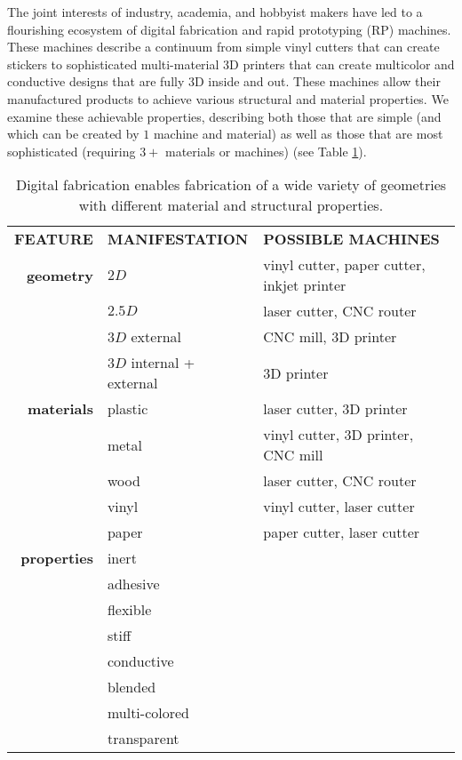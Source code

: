 The joint interests of industry, academia, and hobbyist makers have led to a flourishing ecosystem of digital fabrication and rapid prototyping (RP) machines. These machines describe a continuum from simple vinyl cutters that can create stickers to sophisticated multi-material 3D printers that can create multicolor and conductive designs that are fully 3D inside and out. These machines allow their manufactured products to achieve various structural and material properties. We examine these achievable properties, describing both those that are simple (and which can be created by $1$ machine and material) as well as those that are most sophisticated (requiring $3+$ materials or machines) (see Table \ref{table:properties}).


\begin{table}
\begin{center}
\begin{tabular}{rll}
\textbf{FEATURE}& \textbf{MANIFESTATION} & \textbf{POSSIBLE MACHINES} \\
\textbf{geometry} & $2D$ & vinyl cutter, paper cutter, inkjet printer \\
& $2.5D$ & laser cutter, CNC router \\
& $3D$ external & CNC mill, 3D printer \\
& $3D$ internal + external & 3D printer \\
\textbf{materials} & plastic & laser cutter, 3D printer \\
& metal & vinyl cutter, 3D printer, CNC mill \\
& wood & laser cutter, CNC router \\
& vinyl & vinyl cutter, laser cutter \\
& paper & paper cutter, laser cutter \\
\textbf{properties} & inert & \\
& adhesive & \\
& flexible & \\
& stiff & \\
& conductive & \\
& blended & \\
& multi-colored & \\
& transparent & \\
\end{tabular}
\end{center}
\caption{Digital fabrication enables fabrication of a wide variety of geometries with different material and structural properties. }
\label{table:properties}
\end{table}

